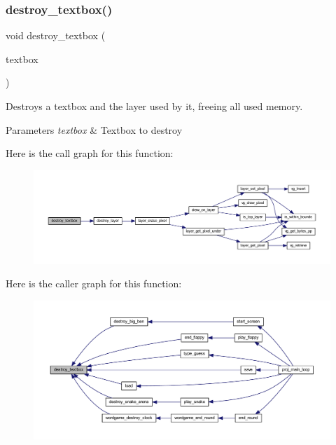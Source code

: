 \subsubsection{\texorpdfstring{destroy\+\_\+textbox()}{destroy\_textbox()}}
{\footnotesize\ttfamily void destroy\+\_\+textbox (\begin{DoxyParamCaption}\item[{\mbox{\hyperlink{struct_text_box}{Text\+Box}} $\ast$}]{textbox }\end{DoxyParamCaption})}



Destroys a textbox and the layer used by it, freeing all used memory. 


\begin{DoxyParams}{Parameters}
{\em textbox} & Textbox to destroy \\
\hline
\end{DoxyParams}
Here is the call graph for this function\+:\nopagebreak
\begin{figure}[H]
\begin{center}
\leavevmode
\includegraphics[width=350pt]{group__textbox_ga75a9b146a69f4c875b18b683f7e5f872_cgraph}
\end{center}
\end{figure}
Here is the caller graph for this function\+:\nopagebreak
\begin{figure}[H]
\begin{center}
\leavevmode
\includegraphics[width=350pt]{group__textbox_ga75a9b146a69f4c875b18b683f7e5f872_icgraph}
\end{center}
\end{figure}
\mbox{\label{group__textbox_ga74cef8828b7e729a30291cc8039728b0}} 
